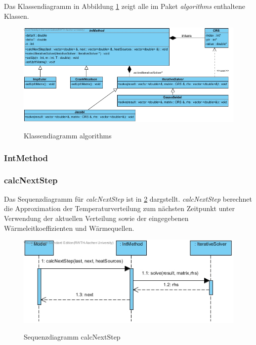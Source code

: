 Das Klassendiagramm in Abbildung \ref{Klassendiagramm algorithms} zeigt alle im Paket \emph{algorithms} enthaltene Klassen.

\begin{figure}[H]
	\centering
	\includegraphics[scale=.65]{Bilder/algorithms.jpg}\\
	\caption{Klassendiagramm algorithms}
	\label{Klassendiagramm algorithms}
\end{figure}

\subsubsection{IntMethod}

\subsubsection*{calcNextStep}

Das Sequenzdiagramm für \emph{calcNextStep} ist in \ref{Sequenzdiagramm calcNextStep} dargstellt. \emph{calcNextStep} berechnet die Approximation der Temperaturverteilung zum nächsten Zeitpunkt unter Verwendung der aktuellen Verteilung sowie der eingegebenen Wärmeleitkoeffizienten und Wärmequellen.

\begin{figure}[H]
	\centering
	\includegraphics[scale=.6]{Bilder/IntMethod__calcNextStep().jpg}\\
	\caption{Sequenzdiagramm calcNextStep}
	\label{Sequenzdiagramm calcNextStep}
\end{figure}

